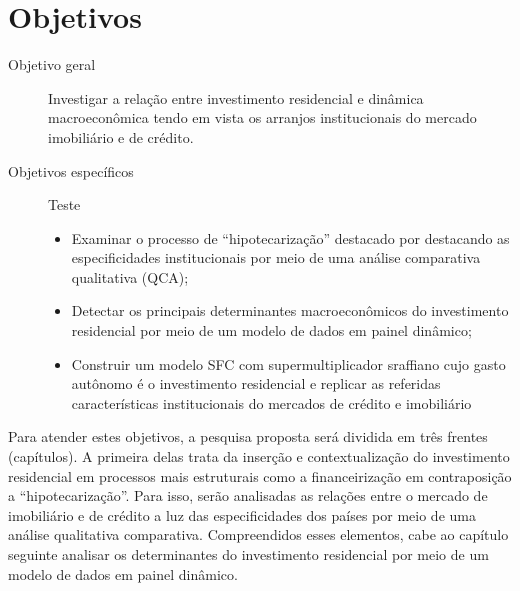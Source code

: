 \section{Objetivos}\label{OBJ}


\begin{description}
	\item[Objetivo geral] Investigar a relação entre investimento residencial e dinâmica macroeconômica tendo em vista os arranjos institucionais do mercado imobiliário e de crédito.
	\item[Objetivos específicos] {\color{white}Teste}
	\begin{itemize}
		\item Examinar o processo de ``hipotecarização'' destacado por \textcite{jorda_great_2014} destacando as especificidades institucionais por meio de uma análise comparativa qualitativa (QCA);
		\item  Detectar os principais determinantes macroeconômicos do investimento residencial por meio de um modelo de dados em painel dinâmico;
		\item Construir um modelo SFC com supermultiplicador sraffiano cujo gasto autônomo é o investimento residencial e replicar as referidas características institucionais do mercados de crédito e imobiliário
	\end{itemize}
\end{description}


Para atender estes objetivos, a pesquisa proposta será dividida em três frentes (capítulos).
A primeira delas trata da inserção e contextualização do investimento residencial em processos mais estruturais como a financeirização em contraposição a ``hipotecarização''. 
Para isso, serão analisadas as relações entre o mercado de imobiliário e de crédito a luz das especificidades dos países por meio de uma análise qualitativa comparativa. Compreendidos esses elementos, cabe ao capítulo seguinte analisar os determinantes do investimento residencial por meio de um modelo de dados em painel dinâmico. 

